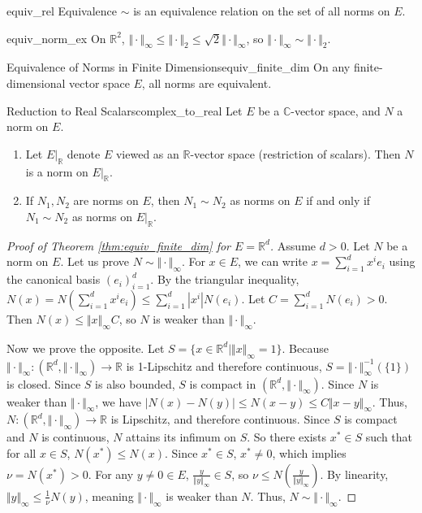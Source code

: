 \documentclass[11pt, a4paper]{article}
\newcommand{\R}{\mathbb{R}}
\newcommand{\C}{\mathbb{C}}
\begin{document}
\begin{proposition}{}{equiv_rel}
Equivalence $\sim$ is an equivalence relation on the set of all norms on $E$.
\end{proposition}

\begin{example}{}{equiv_norm_ex}
On $\R^2$, $\Vert \cdot \Vert_\infty \le \Vert \cdot \Vert_2 \le \sqrt{2} \Vert \cdot \Vert_\infty$, so $\Vert \cdot \Vert_\infty \sim \Vert \cdot \Vert_2$.
\end{example}

\begin{theorem}{Equivalence of Norms in Finite Dimensions}{equiv_finite_dim}
On any finite-dimensional vector space $E$, all norms are equivalent.
\end{theorem}

\begin{lemma}{Reduction to Real Scalars}{complex_to_real}
Let $E$ be a $\C$-vector space, and $N$ a norm on $E$.
\begin{enumerate}
    \item Let $E|_\R$ denote $E$ viewed as an $\R$-vector space (restriction of scalars). Then $N$ is a norm on $E|_\R$.
    \item If $N_1, N_2$ are norms on $E$, then $N_1 \sim N_2$ as norms on $E$ if and only if $N_1 \sim N_2$ as norms on $E|_\R$.
\end{enumerate}
\end{lemma}

\begin{proof}[Proof of Theorem \ref{thm:equiv_finite_dim} for $E = \R^d$]
Assume $d > 0$. Let $N$ be a norm on $E$. Let us prove $N \sim \Vert \cdot \Vert_\infty$.
For $x \in E$, we can write $x = \sum_{i=1}^d x^i e_i$ using the canonical basis $(e_i)_{i=1}^d$.
By the triangular inequality, $N(x) = N(\sum_{i=1}^d x^i e_i) \le \sum_{i=1}^d |x^i| N(e_i)$.
Let $C = \sum_{i=1}^d N(e_i) > 0$. Then $N(x) \le \Vert x \Vert_\infty C$, so $N$ is weaker than $\Vert \cdot \Vert_\infty$.

Now we prove the opposite.
Let $S = \{ x \in \R^d \mid \Vert x \Vert_\infty = 1 \}$.
Because $\Vert \cdot \Vert_\infty: (\R^d, \Vert \cdot \Vert_\infty) \to \R$ is 1-Lipschitz and therefore continuous, $S = \Vert \cdot \Vert_\infty^{-1}(\{1\})$ is closed.
Since $S$ is also bounded, $S$ is compact in $(\R^d, \Vert \cdot \Vert_\infty)$.
Since $N$ is weaker than $\Vert \cdot \Vert_\infty$, we have $|N(x) - N(y)| \le N(x-y) \le C \Vert x-y \Vert_\infty$.
Thus, $N: (\R^d, \Vert \cdot \Vert_\infty) \to \R$ is Lipschitz, and therefore continuous.
Since $S$ is compact and $N$ is continuous, $N$ attains its infimum on $S$.
So there exists $x^* \in S$ such that for all $x \in S$, $N(x^*) \le N(x)$.
Since $x^* \in S$, $x^* \neq 0$, which implies $\nu = N(x^*) > 0$.
For any $y \neq 0 \in E$, $\frac{y}{\Vert y \Vert_\infty} \in S$, so $\nu \le N\left(\frac{y}{\Vert y \Vert_\infty}\right)$.
By linearity, $\Vert y \Vert_\infty \le \frac{1}{\nu} N(y)$, meaning $\Vert \cdot \Vert_\infty$ is weaker than $N$.
Thus, $N \sim \Vert \cdot \Vert_\infty$.
\end{proof}
\end{document}
